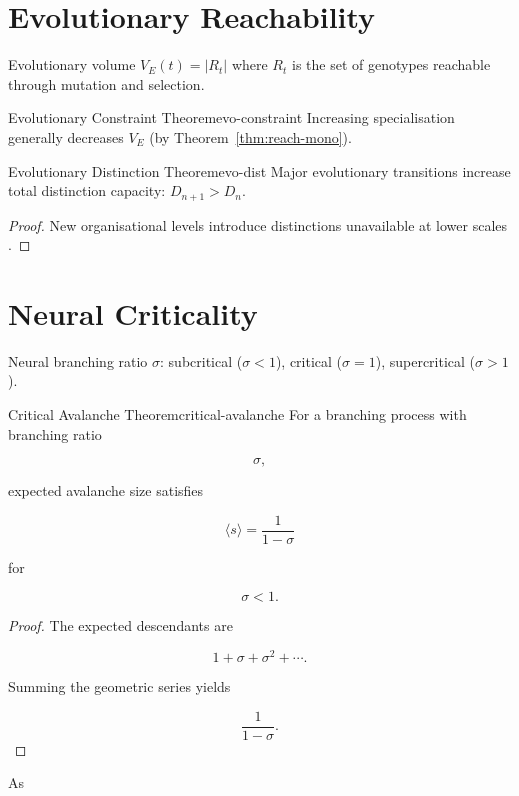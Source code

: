 \documentclass[12pt,twoside,openright]{book}
\begin{document}
\section{Evolutionary Reachability}

Evolutionary volume $V_E(t) = |R_t|$ where $R_t$ is
the set of genotypes reachable through mutation and
selection.

\begin{theorem}{Evolutionary Constraint Theorem}{evo-constraint}
  Increasing specialisation generally decreases $V_E$
  (by Theorem~\ref{thm:reach-mono}).
\end{theorem}

\begin{theorem}{Evolutionary Distinction Theorem}{evo-dist}
  Major evolutionary transitions increase total
  distinction capacity: $D_{n+1} > D_n$.
\end{theorem}

\begin{proof}
  New organisational levels introduce distinctions
  unavailable at lower scales
  \parencite{maynard-smith1995major}.
\end{proof}

\section{Neural Criticality}

Neural branching ratio $\sigma$:
subcritical ($\sigma<1$), critical ($\sigma=1$),
supercritical ($\sigma>1$).

\begin{theorem}{Critical Avalanche Theorem}{critical-avalanche}
For a branching process with branching ratio

\[
\sigma,
\]

expected avalanche size satisfies

\[
\langle s\rangle
=
\frac{1}{1-\sigma}
\]

for

\[
\sigma<1.
\]
\end{theorem}

\begin{proof}
The expected descendants are

\[
1+\sigma+\sigma^2+\cdots.
\]

Summing the geometric series yields

\[
\frac{1}{1-\sigma}.
\]
\end{proof}

As
\end{document}
